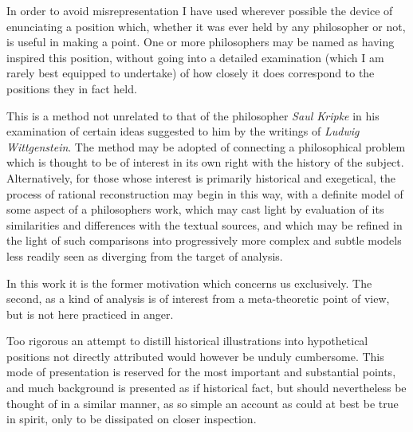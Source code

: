 In order to avoid misrepresentation I have used wherever possible the
device of enunciating a position which, whether it was ever held by
any philosopher or not, is useful in making a point.
One or more philosophers may be named as having inspired this
position, without going into a detailed examination (which I am
rarely best equipped to undertake) of how closely it does correspond to
the positions they in fact held.

This is a method not unrelated to that of the philosopher {\it Saul
  Kripke} in his examination of certain ideas suggested to him by the
writings of {\it Ludwig Wittgenstein}.
The method may be adopted of connecting a philosophical problem which
is thought to be of interest in its own right with the history of the
subject.
Alternatively, for those whose interest is primarily historical and
exegetical, the process of rational reconstruction may begin in this
way, with a definite model of some aspect of a philosophers work,
which may cast light by evaluation of its similarities and differences
with the textual sources, and which may be refined in the light of
such comparisons into progressively more complex and subtle models
less readily seen as diverging from the target of analysis.

In this work it is the former motivation which concerns us
exclusively.
The second, as a kind of analysis is of interest from a meta-theoretic
point of view, but is not here practiced in anger. 

Too rigorous an attempt to distill historical illustrations into
hypothetical positions not directly attributed would however be unduly
cumbersome.
This mode of presentation is reserved for the most important and
substantial points, and much background is presented as if historical
fact, but should nevertheless be thought of in a similar manner, as so
simple an account as could at best be true in spirit, only to be
dissipated on closer inspection.
